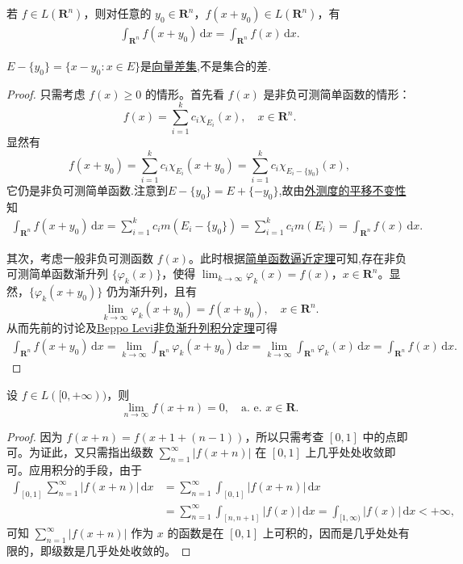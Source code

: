 \documentclass[../../main.tex]{subfiles}
\begin{document}
\begin{theorem}[积分变量的平移变换定理]\label{theorem:积分变量的平移变换定理}
若 $f \in L(\mathbf{R}^n)$，则对任意的 $y_0 \in \mathbf{R}^n$，$f(x + y_0) \in L(\mathbf{R}^n)$，有
\begin{align*}
\int_{\mathbf{R}^n} f(x + y_0) \, \mathrm{d}x = \int_{\mathbf{R}^n} f(x) \, \mathrm{d}x.
\end{align*}
\end{theorem}
\begin{remark}
$E-\{y_0\}=\{x-y_0:x\in E\}$是\hyperref[definition:向量差集]{向量差集},不是集合的差.
\end{remark}
\begin{proof}
只需考虑 $f(x) \geqslant 0$ 的情形。首先看 $f(x)$ 是非负可测简单函数的情形：
\[
f(x) = \sum_{i=1}^k c_i \chi_{E_i}(x), \quad x \in \mathbf{R}^n.
\]
显然有
\[
f(x+y_0)=\sum_{i=1}^k{c_i\chi _{E_i}(x+y_0)}=\sum_{i=1}^k{c_i\chi _{E_i-\{y_0\}}(x)},
\]
它仍是非负可测简单函数.注意到$E-\{y_0\}=E+\{-y_0\}$,故由\hyperref[theorem:外测度的平移不变性]{外测度的平移不变性}知
\begin{align*}
\int_{\mathbf{R}^n} f(x + y_0) \, \mathrm{d}x = \sum_{i=1}^k c_i m(E_i - \{ y_0 \})
= \sum_{i=1}^k c_i m(E_i) = \int_{\mathbf{R}^n} f(x) \, \mathrm{d}x.
\end{align*}

其次，考虑一般非负可测函数 $f(x)$。此时根据\hyperref[theorem:简单函数逼近定理]{简单函数逼近定理}可知,存在非负可测简单函数渐升列 $\{ \varphi_k(x) \}$，使得 $\lim_{k \to \infty} \varphi_k(x) = f(x)$，$x \in \mathbf{R}^n$。显然，$\{ \varphi_k(x + y_0) \}$ 仍为渐升列，且有
\[
\lim_{k \to \infty} \varphi_k(x + y_0) = f(x + y_0), \quad x \in \mathbf{R}^n.
\]
从而先前的讨论及\hyperref[theorem:Beppo Levi非负渐升列积分定理]{Beppo Levi非负渐升列积分定理}可得
\begin{align*}
\int_{\mathbf{R}^n} f(x + y_0) \, \mathrm{d}x = \lim_{k \to \infty} \int_{\mathbf{R}^n} \varphi_k(x + y_0) \, \mathrm{d}x 
= \lim_{k \to \infty} \int_{\mathbf{R}^n} \varphi_k(x) \, \mathrm{d}x = \int_{\mathbf{R}^n} f(x) \, \mathrm{d}x.
\end{align*}
\end{proof}

\begin{example}
设 $f \in L([0, +\infty))$，则
\[
\lim_{n \to \infty} f(x + n) = 0, \quad \text{a. e. } x \in \mathbf{R}.
\]
\end{example}
\begin{proof}
因为 $f(x + n) = f(x + 1 + (n - 1))$，所以只需考查 $[0, 1]$ 中的点即可。为证此，又只需指出级数 $\sum_{n=1}^{\infty} |f(x + n)|$ 在 $[0, 1]$ 上几乎处处收敛即可。应用积分的手段，由于
\begin{align*}
\int_{[0, 1]} \sum_{n=1}^{\infty} |f(x + n)| \, \mathrm{d}x &= \sum_{n=1}^{\infty} \int_{[0, 1]} |f(x + n)| \, \mathrm{d}x \\
&= \sum_{n=1}^{\infty} \int_{[n, n + 1]} |f(x)| \, \mathrm{d}x = \int_{[1, \infty)} |f(x)| \, \mathrm{d}x < +\infty,
\end{align*}
可知 $\sum_{n=1}^{\infty} |f(x + n)|$ 作为 $x$ 的函数是在 $[0, 1]$ 上可积的，因而是几乎处处有限的，即级数是几乎处处收敛的。
\end{proof}
\end{document}
